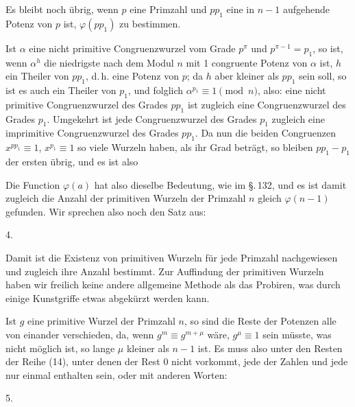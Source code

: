 
Es bleibt noch übrig, wenn $p$ eine Primzahl und $pp_1$ eine in $n-1$
aufgehende Potenz von $p$ ist, $\varphi(pp_1)$ zu bestimmen.

Ist $\alpha$ eine nicht primitive Congruenzwurzel vom Grade $p^{\pi}$ und
$p^{\pi-1} = p_1$, so ist, wenn $\alpha^h$ die niedrigste nach dem Modul
$n$ mit 1 congruente Potenz von $\alpha$ ist, $h$ ein Theiler von $pp_1$,
d.\,h. eine Potenz von $p$; da $h$ aber kleiner als $pp_1$ sein soll, so
ist es auch ein Theiler von $p_1$, und folglich $\alpha^{p_1} \equiv 1
\pmod{n}$, also: eine nicht primitive Congruenzwurzel des Grades $pp_1$
ist zugleich eine Congruenzwurzel des Grades $p_1$. Umgekehrt ist jede
Congruenzwurzel des Grades $p_1$ zugleich eine imprimitive
Congruenzwurzel des Grades $pp_1$. Da nun die beiden Congruenzen
$x^{pp_1} \equiv 1$, $x^{p_1} \equiv 1$ so viele Wurzeln haben, als ihr
Grad beträgt, so bleiben $pp_1 - p_1$  der
ersten übrig, und es ist also

Die Function $\varphi(a)$ hat also dieselbe Bedeutung, wie im \S.\,132,
und es ist damit zugleich die Anzahl der primitiven Wurzeln der Primzahl
$n$ gleich $\varphi(n-1)$ gefunden. Wir sprechen also noch den Satz aus:

4.\ 

Damit ist die Existenz von primitiven Wurzeln für jede Primzahl
nachgewiesen und zugleich ihre Anzahl bestimmt. Zur Auffindung der
primitiven Wurzeln haben wir freilich keine andere allgemeine Methode
als das Probiren, was durch einige Kunstgriffe etwas abgekürzt werden
kann.

Ist $g$ eine primitive Wurzel der Primzahl $n$, so sind die Reste der
Potenzen
alle von einander verschieden, da, wenn $g^m \equiv g^{m+\mu}$ wäre,
$g^{\mu} \equiv 1$ sein müsste, was nicht möglich ist, so lange $\mu$
kleiner als $n-1$ ist. Es muss also unter den Resten der Reihe (14),
unter denen der Rest 0 nicht vorkommt, jede der Zahlen
und jede nur einmal enthalten sein, oder mit anderen Worten:

5.\ 
